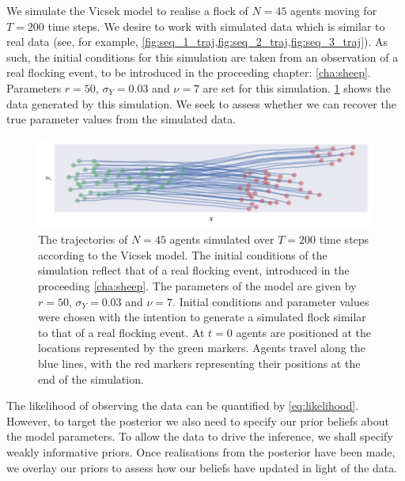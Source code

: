 We simulate the Vicsek model to realise a flock of $N=45$ agents moving for
$T=200$ time steps. We desire to work with simulated data which is similar to
real data (see, for example,
\cref{fig:seq_1_traj,fig:seq_2_traj,fig:seq_3_traj}). As such, the initial
conditions for this simulation are taken from an observation of a real flocking
event, to be introduced in the proceeding chapter: \cref{cha:sheep}. Parameters
$r=50$, $\sigma_Y=0.03$ and $\nu=7$ are set for this simulation.
\cref{fig:vicsek_sim} shows the data generated by this simulation. We seek to
assess whether we can recover the true parameter values from the simulated
data.

\begin{figure}[tbp]
  \includegraphics{r_sim.pdf}
  \caption{The trajectories of $N=45$ agents simulated over $T=200$ time steps
      according to the Vicsek model. The initial conditions of the simulation
      reflect that of a real flocking event, introduced in the proceeding
      \cref{cha:sheep}. The parameters of the model are given by $r=50$,
      $\sigma_Y=0.03$ and $\nu=7$. Initial conditions and parameter values were
      chosen with the intention to generate a simulated flock similar to that
      of a real flocking event. At $t=0$ agents are positioned at the locations
      represented by the green markers. Agents travel along the blue lines, with
      the red markers representing their positions at the end of the simulation.}
  \label{fig:vicsek_sim}
\end{figure}

The likelihood of observing the data can be quantified by \cref{eq:likelihood}.
However, to target the posterior we also need to specify our prior beliefs
about the model parameters. To allow the data to drive the inference, we shall
specify weakly informative priors. Once realisations from the posterior have
been made, we overlay our priors to assess how our beliefs have updated in
light of the data.

